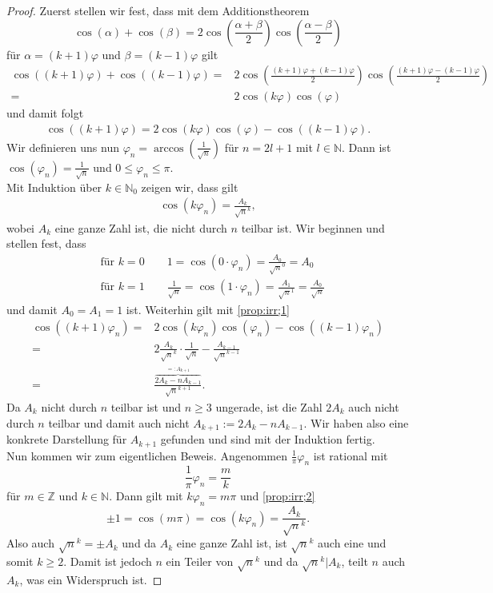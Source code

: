 \documentclass[11pt,titlepage]{article}
\newcommand{\setN}{\mathbb{N}}
\newcommand{\setZ}{\mathbb{Z}}
\theoremstyle{definition}
\theoremstyle{remark}
\begin{document}
	\begin{proof}
		Zuerst stellen wir fest, dass mit dem Additionstheorem
		\[\cos(\alpha)+\cos(\beta)=2\cos\left(\frac{\alpha+\beta}{2}\right)\cos\left(\frac{\alpha-\beta}{2}\right) \]
		für $\alpha=(k+1)\varphi$ und $\beta=(k-1)\varphi$ gilt
		\begin{align*}
			\cos\left((k+1)\varphi\right)+\cos\left((k-1)\varphi\right)=&2\cos\left(\frac{(k+1)\varphi+(k-1)\varphi}{2}\right)
			\cos\left(\frac{(k+1)\varphi-(k-1)\varphi}{2}\right) \\
			=& 2\cos(k\varphi)\cos(\varphi)
		\end{align*}
		und damit folgt
		\begin{align}
			\cos((k+1)\varphi)=2\cos(k\varphi)\cos(\varphi)-\cos((k-1)\varphi). \label{prop:irr;1}
		\end{align}
		Wir definieren uns nun $\varphi_n=\arccos(\frac{1}{\sqrt{n}})$ für $n=2l+1$ mit $l\in\setN$. Dann ist 
		$\cos(\varphi_n)=\frac{1}{\sqrt{n}}$ und $0\leq\varphi_n\leq\pi$. \\
		Mit Induktion über $k\in\setN_0$ zeigen wir, dass gilt
		\begin{align}
			\cos(k\varphi_n)=\frac{A_k}{\sqrt{n}^k}, \label{prop:irr;2}
		\end{align}
		wobei $A_k$ eine ganze Zahl ist, die nicht durch $n$ teilbar ist. Wir beginnen und stellen fest, dass
		\begin{align*}
			&\text{für $k=0$}\qquad 1=\cos(0\cdot\varphi_n)=\frac{A_0}{\sqrt{n}^0}=A_0 \\
			&\text{für $k=1$}\qquad \frac{1}{\sqrt{n}}=\cos({1\cdot\varphi_n})=\frac{A_1}{\sqrt{n}^1}=\frac{A_0}{\sqrt{n}}
		\end{align*}
		und damit $A_0=A_1=1$ ist. Weiterhin gilt mit \ref{prop:irr;1}
		\begin{align*}
			\cos((k+1)\varphi_n)=& 2\cos(k\varphi_n)\cos(\varphi_n) -\cos((k-1)\varphi_n) \\
			=&2\frac{A_k}{\sqrt{n}^k}\cdot\frac{1}{\sqrt{n}}-\frac{A_{k-1}}{\sqrt{n}^{k-1}} \\
			=&\frac{\overbrace{2 A_k-nA_{k-1}}^{=:A_{k+1}}}{\sqrt{n}^{k+1}}.
		\end{align*}
		Da $A_k$ nicht durch $n$ teilbar ist und $n\geq 3$ ungerade, ist die Zahl $2A_k$ auch nicht durch $n$ teilbar 
		und damit auch nicht $A_{k+1}:=2 A_k -nA_{k-1}$. Wir haben also eine konkrete Darstellung für $A_{k+1}$ 
		gefunden und sind mit der Induktion fertig. \\
		Nun kommen wir zum eigentlichen Beweis. Angenommen $\frac{1}{\pi}\varphi_n$ ist 
		rational mit
		\[\frac{1}{\pi}\varphi_n=\frac{m}{k}\]
		für $m\in\setZ$ und $k\in\setN$. Dann gilt mit $k\varphi_n=m\pi$ und \ref{prop:irr;2}
		\[\pm 1=\cos(m\pi)=\cos(k\varphi_n)=\frac{A_k}{\sqrt{n}^k}. \]
		Also auch $\sqrt{n}^k=\pm A_k$ und da $A_k$ eine ganze Zahl ist, ist $\sqrt{n}^k$ auch eine und somit 
		$k\geq 2$. Damit ist jedoch $n$ ein Teiler von $\sqrt{n}^k$ und da $\sqrt{n}^k \vert A_k$, teilt $n$ auch 
		$A_k$, was ein Widerspruch ist.
	\end{proof}
	
\end{document}
